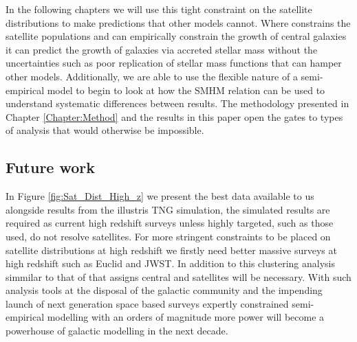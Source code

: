  In the following chapters we will use this tight constraint on the satellite distributions to make predictions that other models cannot. Where \steel constrains the satellite populations and can empirically constrain the growth of central galaxies it can predict the growth of galaxies via accreted stellar mass without the uncertainties such as poor replication of stellar mass functions that can hamper other models. Additionally, we are able to use the flexible nature of a semi-empirical model to begin to look at how the SMHM relation can be used to understand systematic differences between results. The methodology presented in Chapter \ref{Chapter:Method} and the results in this paper open the gates to types of analysis that would otherwise be impossible.
 
 \subsection{Future work}
 In Figure \ref{fig:Sat_Dist_High_z} we present the best data available to us alongside results from the illustris TNG simulation, the simulated results are required as current high redshift surveys unless highly targeted, such as those used, do not resolve satellites. For more stringent constraints to be placed on satellite distributions at high redshift we firstly need better massive surveys at high redshift such as Euclid and JWST. In addition to this clustering analysis simmilar to that of \citet{Yang2012EvolutionHalos} that assigns central and satellites will be necessary. With such analysis tools at the disposal of the galactic community and the impending launch of next generation space based surveys expertly constrained semi-empirical modelling with an orders of magnitude more power will become a powerhouse of galactic modelling in the next decade.